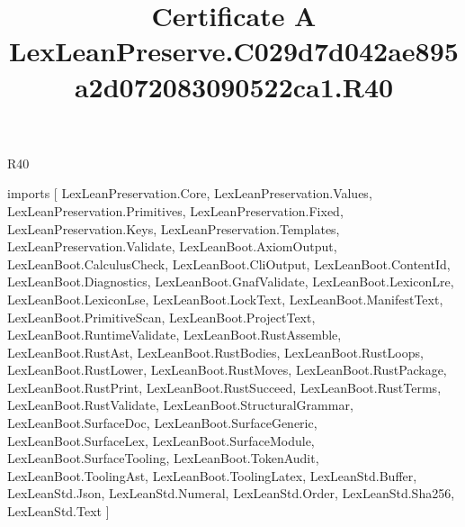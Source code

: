 \begin{lexlean}{R40}
\title{Certificate A LexLeanPreserve.C029d7d042ae895a2d072083090522ca1.R40}
\begin{coremodule}
imports [
  LexLeanPreservation.Core,
  LexLeanPreservation.Values,
  LexLeanPreservation.Primitives,
  LexLeanPreservation.Fixed,
  LexLeanPreservation.Keys,
  LexLeanPreservation.Templates,
  LexLeanPreservation.Validate,
  LexLeanBoot.AxiomOutput,
  LexLeanBoot.CalculusCheck,
  LexLeanBoot.CliOutput,
  LexLeanBoot.ContentId,
  LexLeanBoot.Diagnostics,
  LexLeanBoot.GnafValidate,
  LexLeanBoot.LexiconLre,
  LexLeanBoot.LexiconLse,
  LexLeanBoot.LockText,
  LexLeanBoot.ManifestText,
  LexLeanBoot.PrimitiveScan,
  LexLeanBoot.ProjectText,
  LexLeanBoot.RuntimeValidate,
  LexLeanBoot.RustAssemble,
  LexLeanBoot.RustAst,
  LexLeanBoot.RustBodies,
  LexLeanBoot.RustLoops,
  LexLeanBoot.RustLower,
  LexLeanBoot.RustMoves,
  LexLeanBoot.RustPackage,
  LexLeanBoot.RustPrint,
  LexLeanBoot.RustSucceed,
  LexLeanBoot.RustTerms,
  LexLeanBoot.RustValidate,
  LexLeanBoot.StructuralGrammar,
  LexLeanBoot.SurfaceDoc,
  LexLeanBoot.SurfaceGeneric,
  LexLeanBoot.SurfaceLex,
  LexLeanBoot.SurfaceModule,
  LexLeanBoot.SurfaceTooling,
  LexLeanBoot.TokenAudit,
  LexLeanBoot.ToolingAst,
  LexLeanBoot.ToolingLatex,
  LexLeanStd.Buffer,
  LexLeanStd.Json,
  LexLeanStd.Numeral,
  LexLeanStd.Order,
  LexLeanStd.Sha256,
  LexLeanStd.Text
]


\end{coremodule}
\end{lexlean}
